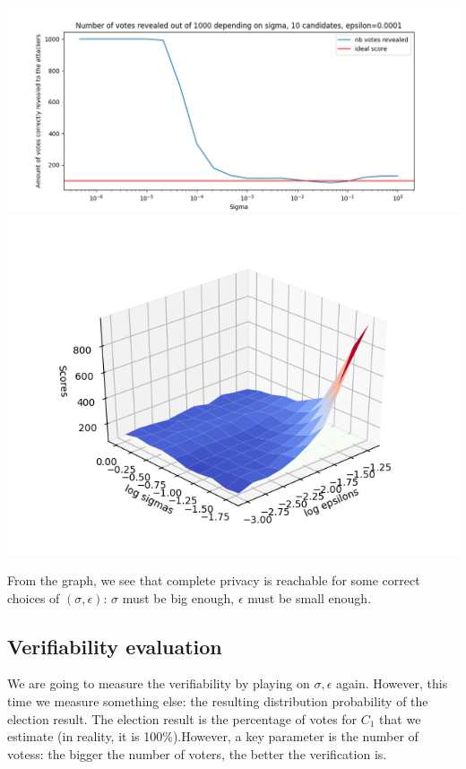 \documentclass{article}
\begin{document}
\includegraphics[scale=0.5]{distribution_proba/influence_sigma.png}
\includegraphics[scale=0.8]{distribution_proba/influence_sigma_epsilon.png}


From the graph, we see that complete privacy is reachable for some correct choices of $(\sigma, \epsilon)$: $\sigma$ must be big enough, $\epsilon$ must be small enough.

\subsection{Verifiability evaluation}


We are going to measure the verifiability by playing on $\sigma, \epsilon$ again. However, this time we measure something else: the resulting distribution probability of the election result. The election result is the percentage of votes for $C_1$ that we estimate (in reality, it is 100\%).However, a key parameter is the number of votess: the bigger the number of voters, the better the verification is.
\end{document}

